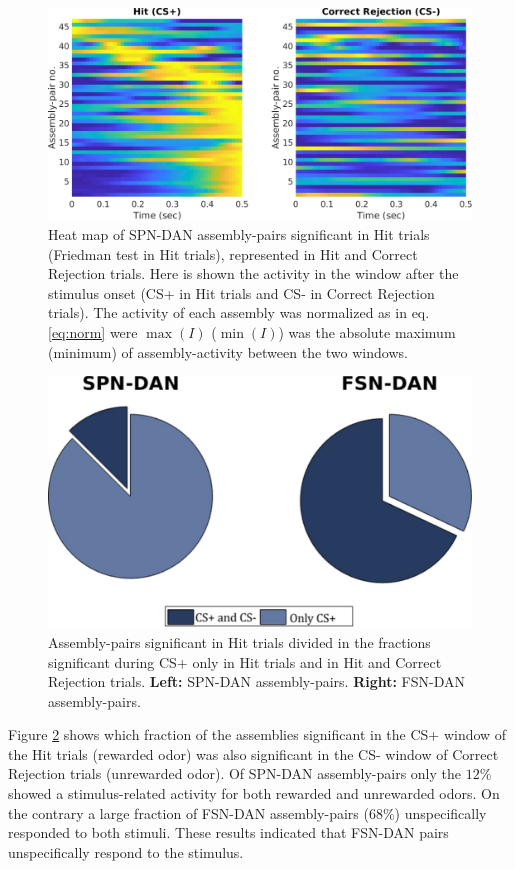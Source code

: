 \begin{figure}[H]
\centering
\includegraphics[scale=0.44]{figures/SD_HitCorrRejComp.pdf}
\caption{Heat map of SPN-DAN assembly-pairs significant in Hit trials (Friedman test in Hit trials), represented in Hit and Correct Rejection trials. Here is shown the activity in the window after the stimulus onset (CS+ in Hit trials and CS- in Correct Rejection trials). The activity of each assembly was normalized as in eq.\ref{eq:norm} were $\max(I)$ ($\min(I)$) was the absolute maximum (minimum) of assembly-activity between the two windows.}
\label{fig:SD_HitCorrComp}
\end{figure}
\begin{figure}[H]
\centering
\includegraphics[scale=0.51]{figures/HItCorrRejPieOverlapSD_FD.pdf}
\caption{Assembly-pairs significant in Hit trials divided in the fractions significant during CS+ only in Hit trials and in Hit and Correct Rejection trials. \textbf{Left:} SPN-DAN assembly-pairs. \textbf{Right:} FSN-DAN assembly-pairs.}
\label{fig:Overlap}
\end{figure}
Figure \ref{fig:Overlap} shows which fraction of the assemblies significant in the CS+ window of the Hit trials (rewarded odor) was also significant in the CS- window of Correct Rejection trials (unrewarded odor). Of SPN-DAN assembly-pairs only the $12\%$ showed a stimulus-related activity for both rewarded and unrewarded odors. On the contrary a large fraction of FSN-DAN assembly-pairs ($68\%$) unspecifically responded to both stimuli. These results indicated that FSN-DAN pairs unspecifically respond to the stimulus.
